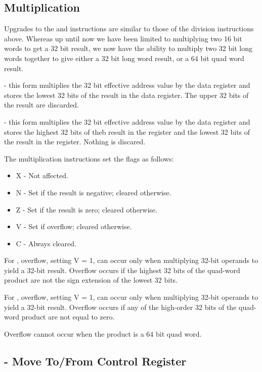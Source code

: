 \subsection{Multiplication}

Upgrades to the  and  instructions are similar to those of the division instructions above. Whereas up until now we have been limited to multiplying two 16 bit words to get a 32 bit result, we now have the ability to multiply two 32 bit long words together to give either a 32 bit long word result, or a 64 bit quad word result.

 - this form multiplies the 32 bit effective address value by the data register and stores the lowest 32 bits of the result in the data register. The upper 32 bits of the result are discarded.

 - this form multiplies the 32 bit effective address value by the data register and stores the highest 32 bits of theb result in the  register and the lowest 32 bits of the result in the  register. Nothing is discared.

The multiplication instructions set the flags as follows:

\begin{itemize}
    \item X - Not affected.
    \item N - Set if the result is negative; cleared otherwise.
    \item Z - Set if the result is zero; cleared otherwise.
    \item V - Set if overflow; cleared otherwise.
    \item C - Always cleared.
\end{itemize}

For , overflow, setting V = 1, can occur only when multiplying 32-bit
operands to yield a 32-bit result. Overflow occurs if the highest 32 bits of the quad-word product are not the sign extension of the lowest 32 bits.

For , overflow, setting V = 1, can occur only when multiplying 32-bit
operands to yield a 32-bit result. Overflow occurs if any of the high-order 32 bits of the quad-word product are not equal to zero.

Overflow cannot occur when the product is a 64 bit quad word.

\subsection{ - Move To/From Control Register}

